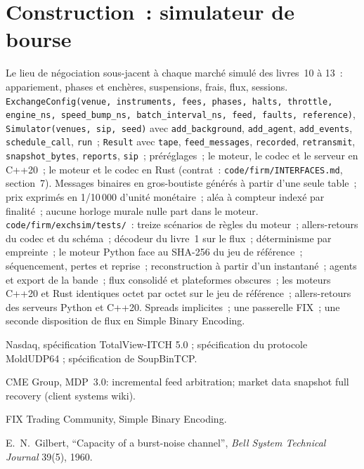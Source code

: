 \section{Construction~: simulateur de bourse}\label{bld:mx:build-a-matching-engine-and-exchange-simulator:exchsim}

\begin{build}
 Le lieu de négociation sous-jacent à chaque marché simulé des livres~10 à 13~: appariement, phases et enchères, suspensions, frais, flux, sessions.
\texttt{ExchangeConfig(venue, instruments, fees, phases, halts, throttle, engine\_ns, speed\_bump\_ns, batch\_interval\_ns, feed, faults, reference)}, \texttt{Simulator(venues, sip, seed)} avec \texttt{add\_background}, \texttt{add\_agent}, \texttt{add\_events},
\texttt{schedule\_call}, \texttt{run}~; \texttt{Result} avec \texttt{tape}, \texttt{feed\_messages}, \texttt{recorded}, \texttt{retransmit},
\texttt{snapshot\_bytes}, \texttt{reports}, \texttt{sip}~; préréglages~; le moteur, le codec et le serveur en C++20~; le moteur et le codec en Rust (contrat~:
\texttt{code/firm/INTERFACES.md}, section~7).
 Messages binaires en gros-boutiste générés à partir d'une seule table~; prix exprimés en 1/10\,000 d'unité monétaire~; aléa à compteur indexé par finalité~;
aucune horloge murale nulle part dans le moteur.
 \texttt{code/firm/exchsim/tests/}~: treize scénarios de règles du moteur~; allers-retours du codec et du schéma~; décodeur du livre~1 sur le
flux~; déterminisme par empreinte~; le moteur Python face au SHA-256 du jeu de référence~; séquencement, pertes et reprise~; reconstruction à partir d'un instantané~; agents et export de la bande~;
flux consolidé et plateformes obscures~; les moteurs C++20 et Rust identiques octet par octet sur le jeu de référence~; allers-retours des serveurs Python et C++20.
 Spreads implicites~; une passerelle FIX~; une seconde disposition de flux en Simple Binary Encoding.
\end{build}

\begin{omsources}
\item Nasdaq, spécification TotalView-ITCH 5.0 ; spécification du protocole MoldUDP64 ; spécification de SoupBinTCP.
\item CME Group, MDP~3.0: incremental feed arbitration; market data snapshot full recovery (client systems wiki).
\item FIX Trading Community, Simple Binary Encoding.
\item E.~N.~Gilbert, ``Capacity of a burst-noise channel'', \emph{Bell System Technical Journal} 39(5), 1960.
\end{omsources}

